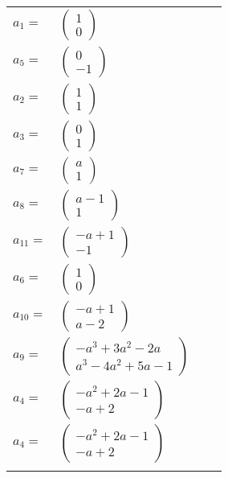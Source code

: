 \documentclass[1p]{elsarticle_modified}
\theoremstyle{definition}
\begin{document}
\begin{tabular}{m{7pt} m{180pt} m{7pt} m{180pt} }
\flushright $a_{1}=$&$\begin{pmatrix}1\\0\end{pmatrix}$ \\
\flushright $a_{5}=$&$\begin{pmatrix}0\\-1\end{pmatrix}$ \\
\flushright $a_{2}=$&$\begin{pmatrix}1\\1\end{pmatrix}$ \\
\flushright $a_{3}=$&$\begin{pmatrix}0\\1\end{pmatrix}$ \\
\flushright $a_{7}=$&$\begin{pmatrix}a\\1\end{pmatrix}$ \\
\flushright $a_{8}=$&$\begin{pmatrix}a-1\\1\end{pmatrix}$ \\
\flushright $a_{11}=$&$\begin{pmatrix}- a+1\\-1\end{pmatrix}$ \\
\flushright $a_{6}=$&$\begin{pmatrix}1\\0\end{pmatrix}$ \\
\flushright $a_{10}=$&$\begin{pmatrix}- a+1\\a-2\end{pmatrix}$ \\
\flushright $a_{9}=$&$\begin{pmatrix}- a^3+3 a^2-2 a\\a^3-4 a^2+5 a-1\end{pmatrix}$ \\
\flushright $a_{4}=$&$\begin{pmatrix}- a^2+2 a-1\\- a+2\end{pmatrix}$\\ \flushright $a_{4}=$&$\begin{pmatrix}- a^2+2 a-1\\- a+2\end{pmatrix}$\\&\end{tabular}
\end{document}
